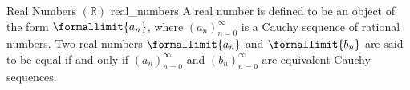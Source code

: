 \begin{definition}{Real Numbers $(\mathbb{R})$ }{real_numbers}
    A real number is defined to be an object of the form $\formallimit{a_n}$, where $(a_n)_{n=0}^\infty$ is a Cauchy sequence of rational numbers.
    Two real numbers $\formallimit{a_n}$ and $\formallimit{b_n}$ are said to be equal if and only if $(a_n)_{n=0}^\infty$ and $(b_n)_{n=0}^\infty$ are equivalent Cauchy sequences.
\end{definition}